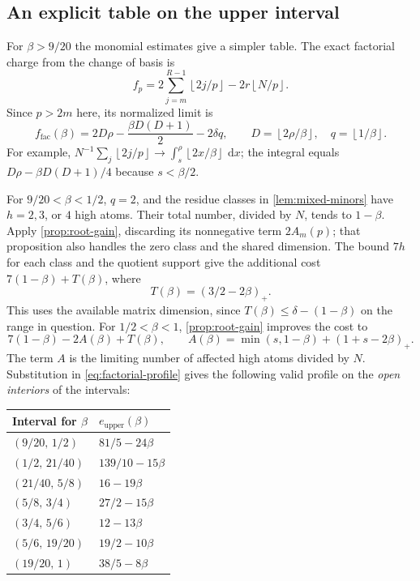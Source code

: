 \documentclass[11pt,letterpaper]{article}
\theoremstyle{definition}
\newcommand{\dd}{\,\mathrm d}
\newcommand{\floor}[1]{\left\lfloor #1\right\rfloor}
\begin{document}
\subsection{An explicit table on the upper interval}
For $\beta>9/20$ the monomial estimates give a simpler table. The exact
factorial charge from the change of basis is
\[
 f_p=2\sum_{j=m}^{R-1}\floor{2j/p}
                  -2r\floor{N/p}.
\]
Since $p>2m$ here, its normalized limit is
\begin{equation}\label{eq:factorial-profile}
 f_{\mathrm{fac}}(\beta)
 =2D\rho-\frac{\beta D(D+1)}2-2\delta q,
 \qquad D=\floor{2\rho/\beta},\quad q=\floor{1/\beta}.
\end{equation}
For example,
$N^{-1}\sum_j\floor{2j/p}\to\int_s^\rho\floor{2x/\beta}\,\dd x$;
the integral equals
$D\rho-\beta D(D+1)/4$ because $s<\beta/2$.

For $9/20<\beta<1/2$, $q=2$, and the residue classes in
\cref{lem:mixed-minors} have $h=2,3$, or $4$ high atoms.
Their total number, divided by $N$, tends to $1-\beta$.
Apply \cref{prop:root-gain}, discarding its nonnegative term $2A_m(p)$;
that proposition also handles the zero class and the shared dimension.
The bound $7h$ for each class and the quotient support give the additional
cost
$7(1-\beta)+T(\beta)$, where
\[
 T(\beta)=(3/2-2\beta)_+.
\]
This uses the available matrix dimension, since
$T(\beta)\le\delta-(1-\beta)$ on the range in question.
For $1/2<\beta<1$, \cref{prop:root-gain} improves the cost to
\[
 7(1-\beta)-2A(\beta)+T(\beta),\qquad
 A(\beta)=\min(s,1-\beta)+(1+s-2\beta)_+ .
\]
The term $A$ is the limiting number of affected high atoms divided by $N$.
Substitution in \eqref{eq:factorial-profile} gives the following valid
profile on the \emph{open interiors} of the intervals:

\begin{center}
\begin{tabular}{@{}ll@{}}
\toprule
Interval for $\beta$ & $e_{\mathrm{upper}}(\beta)$\\
\midrule
$(9/20,\,1/2)$ & $81/5-24\beta$\\
$(1/2,\,21/40)$ & $139/10-15\beta$\\
$(21/40,\,5/8)$ & $16-19\beta$\\
$(5/8,\,3/4)$ & $27/2-15\beta$\\
$(3/4,\,5/6)$ & $12-13\beta$\\
$(5/6,\,19/20)$ & $19/2-10\beta$\\
$(19/20,\,1)$ & $38/5-8\beta$\\
\bottomrule
\end{tabular}
\end{center}
\end{document}
